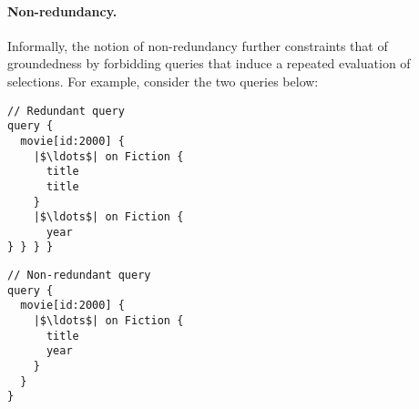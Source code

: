 
\paragraph{Non-redundancy.} Informally, the notion of non-redundancy
further constraints that of groundedness by forbidding queries that induce a repeated evaluation of selections. For example, consider the two queries below:












\smallskip

\begin{minipage}[t]{.25\textwidth}
\begin{verbatim}
// Redundant query
query {
  movie[id:2000] {
    |$\ldots$| on Fiction {
      title
      title
    }
    |$\ldots$| on Fiction {
      year
} } } }
\end{verbatim}
\end{minipage}%
\begin{minipage}[t]{.25\textwidth}
\begin{verbatim}
// Non-redundant query
query {
  movie[id:2000] {
    |$\ldots$| on Fiction {
      title
      year
    }
  }
}
\end{verbatim} 
\end{minipage}


